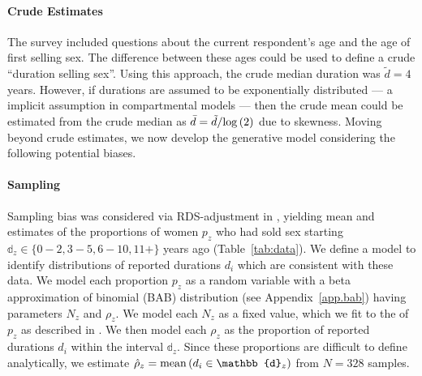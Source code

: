 \paragraph{Crude Estimates}
The survey \cite{Baral2014} included questions about
the current respondent's age and the age of first selling sex.
The difference between these ages could be used to define a crude ``duration selling sex''.
Using this approach, the crude median duration was $\tilde{d} = 4$ years.
However, if durations are assumed to be exponentially distributed
--- a implicit assumption in compartmental models \cite{Anderson1991} ---
then the crude mean could be estimated from the crude median as
$\bar{d} = \tilde{d}/\mathrm{log}\,(2)$ due to skewness.
Moving beyond crude estimates, we now develop the generative model
considering the following potential biases.
\paragraph{Sampling}
Sampling bias was considered via RDS-adjustment in \cite{Baral2014},
yielding mean and \ci estimates of the proportions of women $p_z$
who had sold sex starting $\mathbb{d}_z \in \{0{-}2, 3{-}5, 6{-}10, 11+\}$ years ago
(Table~\ref{tab:data}).
We define a model to identify distributions of reported durations $d_i$
which are consistent with these data.
We model each proportion $p_z$ as a random variable with
a beta approximation of binomial (BAB) distribution (see Appendix~\ref{app.bab})
having parameters $N_z$ and $\rho_z$.
We model each $N_z$ as a fixed value,
which we fit to the \ci of $p_z$ as described in .
We then model each $\rho_z$ as
the proportion of reported durations $d_i$ within the interval $\mathbb{d}_z$.
Since these proportions are difficult to define analytically,
we estimate $\hat{\rho}_z = \distr{mean}{d_i \in \mathbb{d}_z}$ from $N = 328$ samples.
